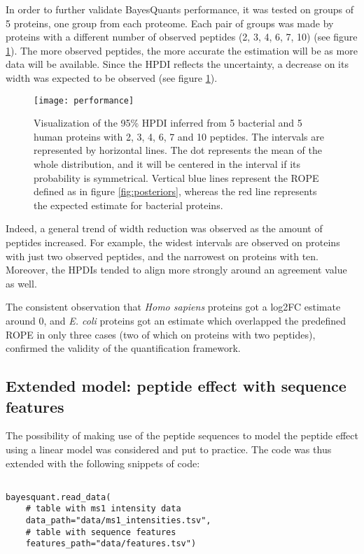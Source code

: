 In order to further validate BayesQuant\textquotesingle s performance, it was tested on groups of 5 proteins, one group from each proteome. Each pair of groups was made by proteins with a different number of observed peptides (2, 3, 4, 6, 7, 10) (see figure \ref{fig:dumbbell}). The more observed peptides, the more accurate the estimation will be as more data will be available. Since the \ac{HPDI} reflects the uncertainty, a decrease on its width was expected to be observed (see figure \ref{fig:dumbbell}).

\begin{figure}[!h]
\centering
\texttt{[image: performance]}
\caption[HPDI inferred by BayesQuant]{Visualization of the 95\% \ac{HPDI} inferred from 5 bacterial and 5 human proteins with 2, 3, 4, 6, 7 and 10 peptides. The intervals are represented by horizontal lines. The dot represents the mean of the whole distribution, and it will be centered in the interval if its probability is symmetrical. Vertical blue lines represent the ROPE defined as in figure \ref{fig:posteriors}, whereas the red line represents the expected estimate for bacterial proteins.}
\label{fig:dumbbell}
\end{figure}


Indeed, a general trend of width reduction was observed as the amount of peptides increased. For example, the widest intervals are observed on proteins with just two observed peptides, and the narrowest on proteins with ten. Moreover, the \ac{HPDI}s tended to align more strongly around an agreement value as well. 

The consistent observation that \textit{Homo sapiens} proteins got a \ac{log2FC} estimate around 0, and \textit{E. coli} proteins got an estimate which overlapped the predefined \ac{ROPE} in only three cases (two of which on proteins with two peptides), confirmed the validity of the quantification framework.

\subsection{Extended model: peptide effect with sequence features}
\label{subsec:extended_model}

The possibility of making use of the peptide sequences to model the peptide effect using a linear model was considered and put to practice. The code was thus extended with the following snippets of code:

\begin{verbatim}

bayesquant.read_data(
    # table with ms1 intensity data
    data_path="data/ms1_intensities.tsv",
    # table with sequence features
    features_path="data/features.tsv")
\end{verbatim}


